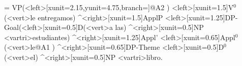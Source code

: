 \begin{exe}
	\ex\label{ex:authier:37}
	\jtree[xunit=2,labelgap=0.2]
	\! = {VP}(<left>[xunit=2.15,yunit=4.75,branch=\blank]{}@A2 )
	<left>[xunit=1.5]{V$^{0}$}(<vert>{le entregamos}) ^<right>[xunit=1.5]{ApplP}
	<left>[xunit=1.25]{DP-Goal}(<left>[xunit=0.5]{D}(<vert>{a las}) 
	^<right>[xunit=0.5]{NP} <vartri>{estudiantes}) 
	^<right>[xunit=1.25]{Appl'}
	<left>[xunit=0.65]{Appl$^{0}$}(<vert>{le}@A1 ) ^<right>[xunit=0.65]{DP-Theme}
	<left>[xunit=0.5]{D$^{0}$}(<vert>{el}) ^<right>[xunit=0.5]{NP} <vartri>{libro}.
	\endjtree
\end{exe}